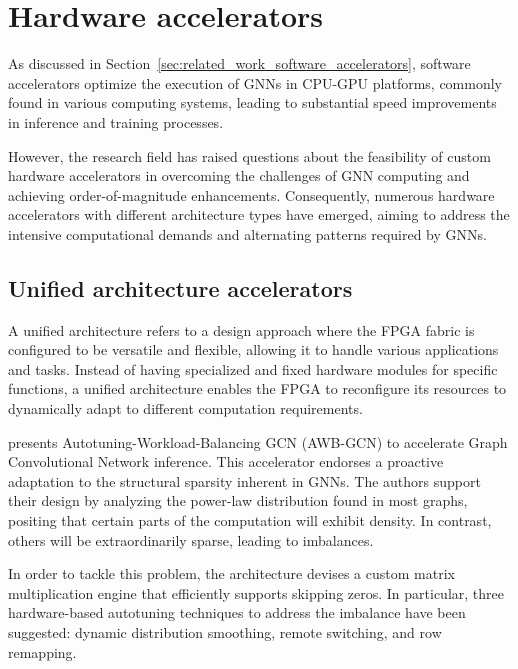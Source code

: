 \section{Hardware accelerators}
\label{sec:hardware_accelerators}

As discussed in Section~\ref{sec:related_work_software_accelerators}, software accelerators optimize the execution of GNNs in CPU-GPU platforms, commonly found in various computing systems, leading to substantial speed improvements in inference and training processes.

However, the research field has raised questions about the feasibility of custom hardware accelerators in overcoming the challenges of GNN computing and achieving order-of-magnitude enhancements.
Consequently, numerous hardware accelerators with different architecture types have emerged, aiming to address the intensive computational demands and alternating patterns required by GNNs.

\subsection{Unified architecture accelerators}\label{subsec:unified-architecture-accelerators}

A unified architecture refers to a design approach where the FPGA fabric is configured to be versatile and flexible, allowing it to handle various applications and tasks.
Instead of having specialized and fixed hardware modules for specific functions, a unified architecture enables the FPGA to reconfigure its resources to dynamically adapt to different computation requirements.

\cite{DBLP:journals/corr/abs-1908-10834} presents Autotuning-Workload-Balancing GCN (AWB-GCN) to accelerate Graph Convolutional Network inference.
This accelerator endorses a proactive adaptation to the structural sparsity inherent in GNNs. The authors support their design by analyzing the power-law distribution found in most graphs, positing that certain parts of the computation will exhibit density. In contrast, others will be extraordinarily sparse, leading to imbalances.

In order to tackle this problem, the architecture devises a custom matrix multiplication engine that efficiently supports skipping zeros.
In particular, three hardware-based autotuning techniques to address the imbalance have been suggested: dynamic distribution smoothing, remote switching, and row remapping.

